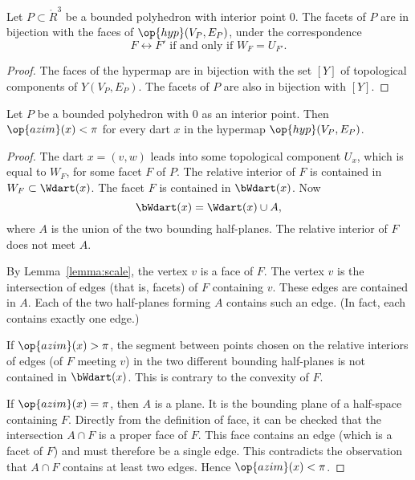 \begin{lemma}\label{lemma:facet-bi}
Let $P\subset\ring{R}^3$ be a bounded polyhedron with interior point $0$.  The
facets of $P$ are in bijection with the faces of $\op{hyp}(V_P,E_P)$, under the
correspondence
$$
F\leftrightarrow F' \text{ if and only if } W_F = U_{F'}.
$$
\end{lemma}

\begin{proof}  The faces of the hypermap are in bijection with the set $[Y]$ of topological components of $Y(V_P,E_P)$.  The facets of $P$ are also in bijection with $[Y]$.
\end{proof}

\begin{lemma} Let $P$ be a bounded polyhedron with $0$ as an interior point.  Then $\op{azim}(x) < \pi$  for every dart $x$ in the hypermap $\op{hyp}(V_P,E_P)$.
\end{lemma}
%
%
%
%

\begin{proof}   The dart $x=(v,w)$ leads into some topological component $U_x$, which is equal to $W_F$, for some facet $F$ of $P$.  The relative interior of $F$ is contained in $W_F\subset \Wdart(x)$.  The facet $F$ is contained in $\bWdart(x)$. Now
$$
\bWdart(x) = \Wdart(x)\cup A,
$$
where $A$ is the union of the two bounding half-planes.   The relative interior of $F$ does not meet $A$.   

By Lemma~\ref{lemma:scale}, the vertex $v$ is a face of $F$.  The vertex $v$ is the intersection of edges (that is, facets) of $F$ containing $v$.  These edges are contained in $A$.  Each of the two half-planes forming $A$ contains such an edge. (In fact, each contains exactly one edge.)
%
%
%
%
%

If $\op{azim}(x)>\pi$, the segment between points chosen on the relative interiors of edges (of $F$ meeting $v$) in the two different bounding half-planes is not contained in $\bWdart(x)$.  This is contrary to the convexity of $F$.
%
%

If $\op{azim}(x)=\pi$, then $A$ is a plane.  It is the bounding plane of a half-space containing $F$.  Directly from the definition of face, it can be checked that the intersection $A\cap F$ is a proper face of $F$.  This face contains an edge (which is a facet of $F$) and must therefore be a single edge.  This contradicts the observation that $A\cap F$ contains at least two edges.  Hence $\op{azim}(x)<\pi$.
\end{proof}



